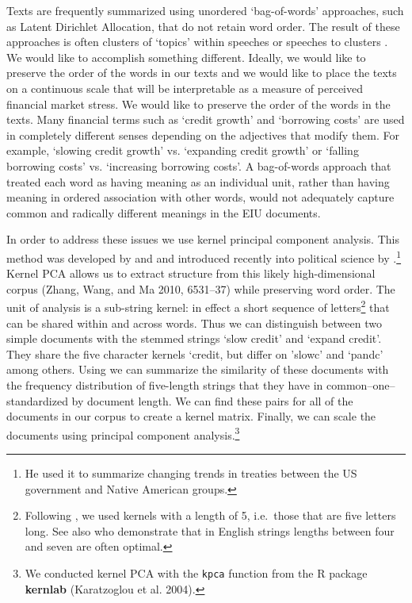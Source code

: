 \documentclass[]{article}
\begin{document}
Texts are frequently summarized using unordered `bag-of-words'
approaches, such as Latent Dirichlet Allocation, that do not retain word
order. The result of these approaches is often clusters of `topics'
within speeches or speeches to clusters \citep[see][for a review]{Grimmer2013}. We would like to accomplish something different. Ideally,
we would like to preserve the order of the words in our texts and we
would like to place the texts on a continuous scale that will be
interpretable as a measure of perceived financial market stress. We
would like to preserve the order of the words in the texts. Many
financial terms such as `credit growth' and `borrowing costs' are used
in completely different senses depending on the adjectives that modify
them. For example, `slowing credit growth' vs. `expanding credit growth'
or `falling borrowing costs' vs. `increasing borrowing costs'. A
bag-of-words approach that treated each word as having meaning as an
individual unit, rather than having meaning in ordered association with
other words, would not adequately capture common and radically different
meanings in the EIU documents.

In order to address these issues we use kernel principal component
analysis. This method was developed by \cite{Scholkopf1998} and \cite{lodhi2002} and introduced recently into political
science by \cite{Spirling2012}.\footnote{He used it to summarize changing
  trends in treaties between the US government and Native American
  groups.} Kernel PCA allows us to extract structure from this likely
high-dimensional corpus (Zhang, Wang, and Ma 2010, 6531--37) while
preserving word order. The unit of analysis is a sub-string kernel: in
effect a short sequence of letters\footnote{Following \cite{Spirling2012},
  we used kernels with a length of 5, i.e.~those that are five letters
  long. See also \cite{lodhi2002} who demonstrate that in English
  strings lengths between four and seven are often optimal.} that can be
shared within and across words. Thus we can distinguish between two
simple documents with the stemmed strings `slow credit' and `expand
credit'. They share the five character kernels `credit, but differ on
'slowc' and `pandc' among others. Using \cite{lodhi2002} we can
summarize the similarity of these documents with the frequency
distribution of five-length strings that they have in
common--one--standardized by document length. We can find these pairs
for all of the documents in our corpus to create a kernel matrix.
Finally, we can scale the documents using principal component
analysis.\footnote{We conducted kernel PCA with the \texttt{kpca}
  function from the R package \textbf{kernlab} (Karatzoglou et al.
  2004).}
\end{document}
